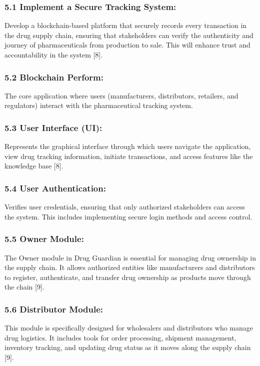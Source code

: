 \documentclass[runningheads]{llncs}
\begin{document}
\subsubsection{5.1 Implement a Secure Tracking System:} Develop a blockchain-based platform that securely records every transaction in the drug supply chain, ensuring that stakeholders can verify the authenticity and journey of pharmaceuticals from production to sale. This will enhance trust and accountability in the system [8].

\subsubsection{5.2 Blockchain Perform:} The core application where users (manufacturers, distributors, retailers, and regulators) interact with the pharmaceutical tracking system.

\subsubsection{5.3 User Interface (UI):} Represents the graphical interface through which users navigate the application, view drug tracking information, initiate transactions, and access features like the knowledge base [8].

\subsubsection{5.4 User Authentication:} Verifies user credentials, ensuring that only authorized stakeholders can access the system. This includes implementing secure login methods and access control.

\subsubsection{5.5 Owner Module:} The Owner module in Drug Guardian is essential for managing drug ownership in the supply chain. It allows authorized entities like manufacturers and distributors to register, authenticate, and transfer drug ownership as products move through the chain  [9].

\subsubsection{5.6 Distributor Module:} This module is specifically designed for wholesalers and distributors who manage drug logistics. It includes tools for order processing, shipment management, inventory tracking, and updating drug status as it moves along the supply chain  [9].
\end{document}
